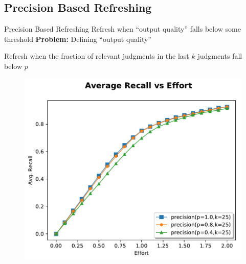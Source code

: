 \documentclass{beamer}
\begin{document}
\subsection{Precision Based Refreshing}
\begin{frame}{Precision Based Refreshing}
Refresh when ``output quality'' falls below some threshold
\vskip 1cm
\textbf{Problem:} Defining ``output quality''

\vskip 1cm
Refresh when the fraction of relevant judgments in the last $k$ judgments fall below $p$
\end{frame}


\begin{frame}
\begin{figure}
 \centering 
 \includegraphics[width=1.0\textwidth]{prec1.pdf}
\end{figure}
\end{frame}
\end{document}
